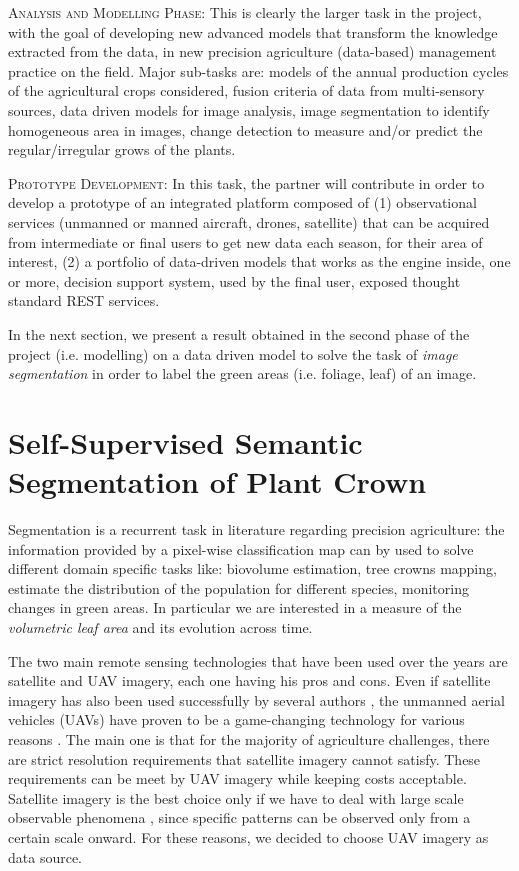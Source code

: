 \documentclass[comsoc,final]{IEEEtran}
\begin{document}
\textsc{Analysis and Modelling Phase:} This is clearly the larger task in the project, with the goal of developing new advanced models that transform the knowledge extracted from the data, in new precision agriculture (data-based) management practice on the field. 
Major sub-tasks are: models of the annual production cycles of the agricultural crops considered, fusion criteria of data from multi-sensory sources, data driven models for image analysis, image segmentation to identify homogeneous area in images, change detection to measure and/or predict the regular/irregular grows of the plants.\medskip 

\textsc{Prototype Development:} In this task, the partner will contribute in order to develop a prototype of an integrated platform composed of (1) observational services (unmanned or manned aircraft, drones, satellite) that can be acquired from intermediate or final users to get new data each season, for their area of interest, (2) a portfolio of data-driven models that works as the engine inside, one or more, decision support system, used by the final user, exposed thought standard REST services. 

In the next section, we present a result obtained in the second phase of the project (i.e. modelling) on a data driven model to solve the task of \emph{image segmentation} in order to label the green areas (i.e. foliage, leaf) of an image.

\section{Self-Supervised Semantic Segmentation of Plant Crown}\label{sec:activities}

Segmentation is a recurrent task in literature regarding precision agriculture: the information provided by a pixel-wise classification map can by used to solve different domain specific tasks \cite{s21051617,rs14061523,Egli20201} like: biovolume estimation, tree crowns mapping, estimate the distribution of the population for different species, monitoring changes in green areas. In particular we are interested in a measure of the \emph{volumetric leaf area} and its evolution across time.

The two main remote sensing technologies that have been used over the years are satellite and UAV imagery, each one having his pros and cons. Even if satellite imagery has also been used successfully by several authors \cite{ruswurm_multi-temporal_2018, daudt_fully_2018, ienco_land_2017}, the unmanned aerial vehicles (UAVs) have proven to be a game-changing technology for various reasons \cite{Adao2017}. The main one is that for the majority of agriculture challenges, there are strict resolution requirements that satellite imagery cannot satisfy. These requirements can be meet by UAV imagery while keeping costs acceptable. Satellite imagery is the best choice only if we have to deal with large scale observable phenomena \cite{gurumurthy_mango_2019,guirado_mask_2021}, since specific patterns can be observed only from a certain scale onward. For these reasons, we decided to choose UAV imagery as data source.
\end{document}
